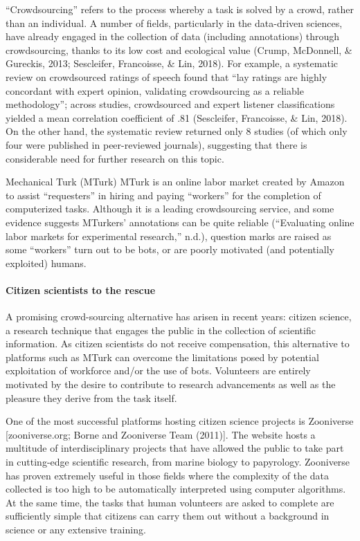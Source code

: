 \documentclass[
  english,
  ,man]{apa6}
\let\oldparagraph\paragraph
\renewcommand{\paragraph}[1]{\oldparagraph{#1}\mbox{}}
\begin{document}
``Crowdsourcing'' refers to the process whereby a task is solved by a crowd, rather than an individual. A number of fields, particularly in the data-driven sciences, have already engaged in the collection of data (including annotations) through crowdsourcing, thanks to its low cost and ecological value (Crump, McDonnell, \& Gureckis, 2013; Sescleifer, Francoisse, \& Lin, 2018). For example, a systematic review on crowdsourced ratings of speech found that ``lay ratings are highly concordant with expert opinion, validating crowdsourcing as a reliable methodology''; across studies, crowdsourced and expert listener classifications yielded a mean correlation coefficient of .81 (Sescleifer, Francoisse, \& Lin, 2018). On the other hand, the systematic review returned only 8 studies (of which only four were published in peer-reviewed journals), suggesting that there is considerable need for further research on this topic.

Mechanical Turk (MTurk) MTurk is an online labor market created by Amazon to assist ``requesters'' in hiring and paying ``workers'' for the completion of computerized tasks. Although it is a leading crowdsourcing service, and some evidence suggests MTurkers' annotations can be quite reliable ({``Evaluating online labor markets for experimental research,''} n.d.), question marks are raised as some ``workers'' turn out to be bots, or are poorly motivated (and potentially exploited) humans.

\hypertarget{citizen-scientists-to-the-rescue}{%
\paragraph{Citizen scientists to the rescue}\label{citizen-scientists-to-the-rescue}}

A promising crowd-sourcing alternative has arisen in recent years: citizen science, a research technique that engages the public in the collection of scientific information. As citizen scientists do not receive compensation, this alternative to platforms such as MTurk can overcome the limitations posed by potential exploitation of workforce and/or the use of bots. Volunteers are entirely motivated by the desire to contribute to research advancements as well as the pleasure they derive from the task itself.

One of the most successful platforms hosting citizen science projects is Zooniverse {[}zooniverse.org; Borne and Zooniverse Team (2011){]}. The website hosts a multitude of interdisciplinary projects that have allowed the public to take part in cutting-edge scientific research, from marine biology to papyrology. Zooniverse has proven extremely useful in those fields where the complexity of the data collected is too high to be automatically interpreted using computer algorithms. At the same time, the tasks that human volunteers are asked to complete are sufficiently simple that citizens can carry them out without a background in science or any extensive training.
\end{document}
